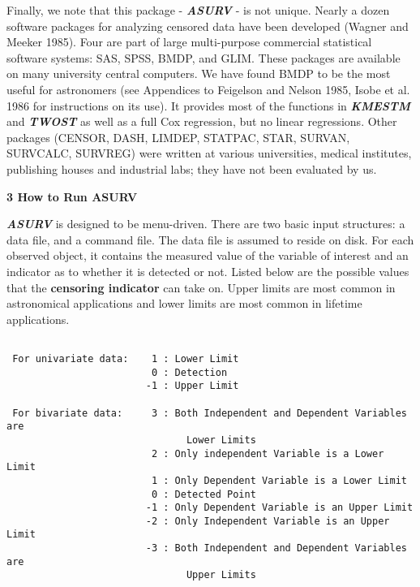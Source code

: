     Finally, we note that this package - {\sl\bf ASURV} - is not unique. 
Nearly a dozen software packages for analyzing censored data have been 
developed (Wagner and Meeker 1985).  Four are part of large multi-purpose 
commercial statistical software systems:  SAS, SPSS, BMDP, and GLIM.  
These packages are available on many university central computers. We have 
found BMDP to be the most useful for astronomers (see Appendices to 
Feigelson and Nelson 1985, Isobe et al. 1986 for instructions on its use).   
It provides most of the functions in {\sl\bf KMESTM} and {\sl\bf TWOST} 
as well as a full Cox regression, but no linear regressions. Other packages 
(CENSOR, DASH, LIMDEP, STATPAC, STAR, SURVAN, SURVCALC, SURVREG) were written 
at various universities, medical institutes, publishing houses and industrial 
labs;  they have not been evaluated by us. 
 

\newpage
\centerline{\Large\bf 3  How to Run ASURV}

\medskip
{}
 
     {\sl\bf ASURV} is designed to be menu-driven.  There are two basic input
structures:  a data file, and a command file.  The data file is assumed to
reside on disk.  For each observed object, it contains the measured value 
of the variable of interest and an indicator as to whether it is detected
or not.  Listed below are the possible values that the {\bf censoring indicator
} can take on.  Upper limits are most common in astronomical applications and
lower limits are most common in lifetime applications. 

\begin{verbatim}

 For univariate data:    1 : Lower Limit
                         0 : Detection
                        -1 : Upper Limit

 For bivariate data:     3 : Both Independent and Dependent Variables are 
                               Lower Limits
                         2 : Only independent Variable is a Lower Limit
                         1 : Only Dependent Variable is a Lower Limit
                         0 : Detected Point
                        -1 : Only Dependent Variable is an Upper Limit
                        -2 : Only Independent Variable is an Upper Limit
                        -3 : Both Independent and Dependent Variables are
                               Upper Limits

\end{verbatim}

